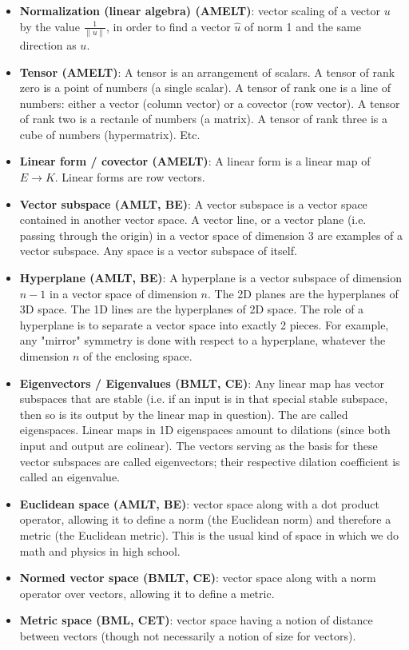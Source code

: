 \documentclass{article}
\begin{document}
\begin{itemize}
	\item \textbf{Normalization (linear algebra) (AMELT)}: vector scaling of a vector $u$ by the value $\frac{1}{\|u\|}$, in order to find a vector $\hat{u}$ of norm 1 and the same direction as $u$.

	\item \textbf{Tensor (AMELT)}: A tensor is an arrangement of scalars. A tensor of rank zero is a point of numbers (a single scalar). A tensor of rank one is a line of numbers: either a vector (column vector) or a covector (row vector). A tensor of rank two is a rectanle of numbers (a matrix). A tensor of rank three is a cube of numbers (hypermatrix). Etc.

	\item \textbf{Linear form / covector (AMELT)}: A linear form is a linear map of $E \rightarrow K$. Linear forms are row vectors.

	\item \textbf{Vector subspace (AMLT, BE)}: A vector subspace is a vector space contained in another vector space. A vector line, or a vector plane (i.e. passing through the origin) in a vector space of dimension 3 are examples of a vector subspace. Any space is a vector subspace of itself.

	\item \textbf{Hyperplane (AMLT, BE)}: A hyperplane is a vector subspace of dimension $n-1$ in a vector space of dimension $n$. The 2D planes are the hyperplanes of 3D space. The 1D lines are the hyperplanes of 2D space. The role of a hyperplane is to separate a vector space into exactly 2 pieces. For example, any "mirror" symmetry is done with respect to a hyperplane, whatever the dimension $n$ of the enclosing space.

	\item \textbf{Eigenvectors / Eigenvalues (BMLT, CE)}: Any linear map has vector subspaces that are stable (i.e. if an input is in that special stable subspace, then so is its output by the linear map in question). The are called eigenspaces. Linear maps in 1D eigenspaces amount to dilations (since both input and output are colinear). The vectors serving as the basis for these vector subspaces are called eigenvectors; their respective dilation coefficient is called an eigenvalue.

	\item \textbf{Euclidean space (AMLT, BE)}: vector space along with a dot product operator, allowing it to define a norm (the Euclidean norm) and therefore a metric (the Euclidean metric). This is the usual kind of space in which we do math and physics in high school.

	\item \textbf{Normed vector space (BMLT, CE)}: vector space along with a norm operator over vectors, allowing it to define a metric.

	\item \textbf{Metric space (BML, CET)}: vector space having a notion of distance between vectors (though not necessarily a notion of size for vectors).

\end{itemize}
\end{document}

